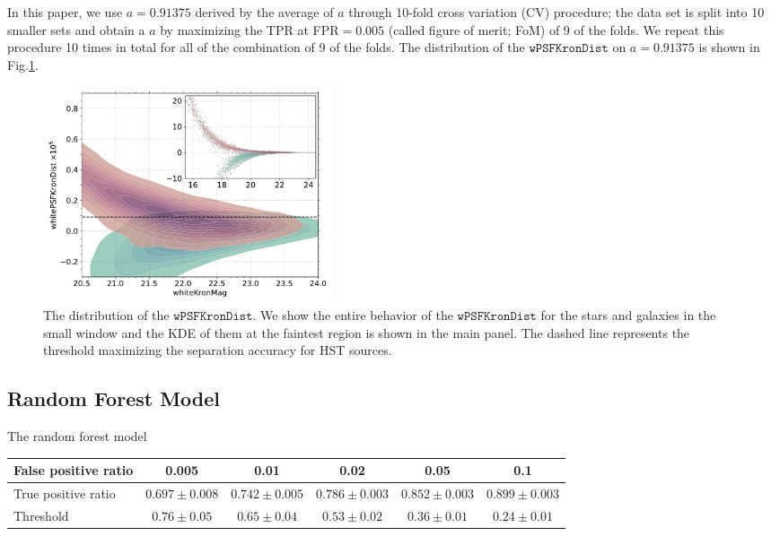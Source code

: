 \documentclass[twocolumn]{aastex62}
\begin{document}
{In this paper, we use $a=0.91375$ derived by the average of $a$ 
through 10-fold cross variation (CV) procedure;   
the data set is split into 10 smaller sets 
and obtain a $a$ by maximizing the TPR at FPR$ = 0.005$ 
(called figure of merit; FoM) of 9 of the folds. 
We repeat this procedure 10 times in total for all of the combination of 9 of the folds. 
The distribution of the $\mathtt{wPSFKronDist}$ on $a=0.91375$ is shown in Fig.\ref{fig:psfkrondist}. 

\begin{figure}[t]
 \centering
  \includegraphics[width=3.35in]{./Figures/whitePSFKronDist.pdf}
  \caption{The distribution of the $\mathtt{wPSFKronDist}$. 
We show the entire behavior of the $\mathtt{wPSFKronDist}$ for the stars and galaxies 
in the small window and the KDE of them at the faintest region is shown in the main panel. 
The dashed line represents the threshold maximizing the separation accuracy for HST sources. }
  \label{fig:psfkrondist}
\end{figure}
}


\subsection{Random Forest Model}\label{sec:rf_model}
The random forest model


\begin{table}
\begin{center}
  \begin{tabular}{lccccc} \\ \hline\hline
    False positive ratio & 
    0.005 &  0.01 & 0.02 & 0.05 & 0.1  \\ \hline
    True positive ratio  & 
    $0.697 \pm 0.008$ &  $0.742 \pm 0.005$ & $0.786 \pm 0.003$ & $0.852 \pm 0.003$ & $0.899 \pm 0.003$ \\
    Threshold & 
    $0.76 \pm 0.05$ &  $0.65 \pm 0.04$ & $0.53 \pm 0.02$ & $0.36 \pm 0.01$ & $0.24 \pm 0.01$  \\ \hline
  \end{tabular}
\end{center}
\end{table}
\end{document}
